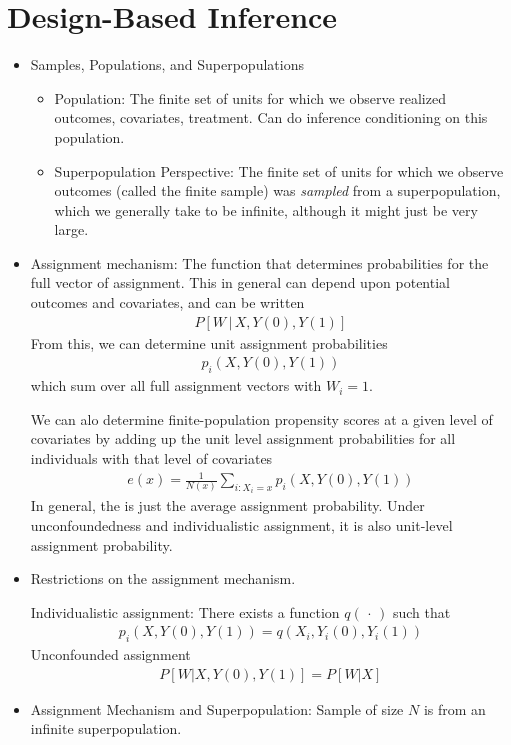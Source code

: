 \documentclass[12pt]{article}
\theoremstyle{plain}
\theoremstyle{definition}
\theoremstyle{remark}
\begin{document}
\clearpage
\section{Design-Based Inference}

\begin{itemize}
  \item Samples, Populations, and Superpopulations
    \begin{itemize}
      \item Population:
        The finite set of units for which we observe realized outcomes,
        covariates, treatment.
        Can do inference conditioning on this population.

      \item Superpopulation Perspective:
        The finite set of units for which we observe outcomes (called
        the finite sample) was \emph{sampled} from a superpopulation,
        which we generally take to be infinite, although it might just
        be very large.
    \end{itemize}
  \item Assignment mechanism:
    The function that determines probabilities for the full vector of
    assignment.
    This in general can depend upon potential outcomes and covariates,
    and can be written
    \begin{align*}
      P[W\,|\,X, Y(0), Y(1)]
    \end{align*}
    From this, we can determine unit assignment probabilities
    \begin{align*}
      p_i(X,Y(0),Y(1))
    \end{align*}
    which sum over all full assignment vectors with $W_i=1$.

    We can alo determine finite-population propensity scores at a given
    level of covariates by adding up the unit level assignment
    probabilities for all individuals with that level of covariates
    \begin{align*}
      e(x)
      =
      \frac{1}{N(x)}
      \sum_{i:X_i=x}
      p_i(X,Y(0),Y(1))
    \end{align*}
    In general, the is just the average assignment probability.
    Under unconfoundedness and individualistic assignment, it is also
    unit-level assignment probability.

  \item Restrictions on the assignment mechanism.

    Individualistic assignment:
    There exists a function $q(\,\cdot\,)$ such that
    \begin{align*}
      p_i(X,Y(0),Y(1))
      =
      q(X_i,Y_i(0),Y_i(1))
    \end{align*}
    Unconfounded assignment
    \begin{align*}
      P[W|X,Y(0),Y(1)]
      =
      P[W|X]
    \end{align*}

  \item
    Assignment Mechanism and Superpopulation:
    Sample of size $N$ is from an infinite superpopulation.
\end{itemize}
\end{document}
